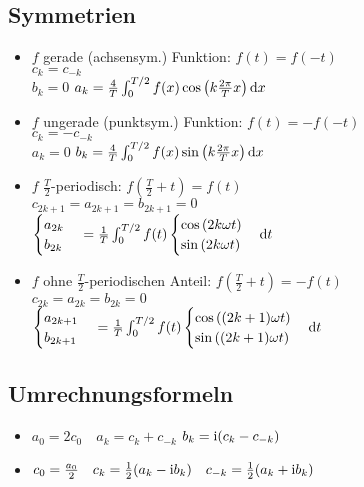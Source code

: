 \documentclass[german,color,6pt]{latex4ei/latex4ei_fs}
\begin{document}
\begin{sectionbox}
	\subsection{Symmetrien}
	\begin{itemize}
		\item $f$ gerade (achsensym.) Funktion: $f(t) = f(-t)$\\
		$c_k = c_{-k}$\\
		$b_k = 0$ \qquad $a_k = \frac{4}{T} \int_{0}^{T/2} f(x) \cos \left(k \frac{2\pi}{T} x \right) \diff x$
		\item $f$ ungerade (punktsym.) Funktion: $f(t) = -f(-t)$\\
		$c_k = -c_{-k}$\\
		$a_k = 0$ \qquad $ b_k = \frac{4}{T} \int_{0}^{T/2} f(x) \sin \left(k \frac{2\pi}{T} x \right) \diff x$
		\item $f$ $\frac{T}{2}$-periodisch: $f(\frac{T}{2} + t) = f(t)$\\
		$c_{2k+1} = a_{2k+1} = b_{2k+1} = 0$\\
		$\begin{cases} a_{2k}\\ b_{2k} \end{cases} = \frac{1}{T}\int_0^{T/2}f(t)\begin{cases} \cos{(2k \omega t)}\\ \sin{(2k \omega t)} \end{cases} \diff t$
		\item $f$ ohne $\frac{T}{2}$-periodischen Anteil: $f(\frac{T}{2} + t) = -f(t)$\\
		$c_{2k} = a_{2k} = b_{2k} = 0$\\
		$\begin{cases} a_{2k+1}\\ b_{2k+1} \end{cases} = \frac{1}{T}\int_0^{T/2}f(t)\begin{cases} \cos{((2k+1) \omega t)}\\ \sin{((2k+1) \omega t)} \end{cases} \diff t$
	\end{itemize}
\end{sectionbox}

\begin{sectionbox}
	\subsection{Umrechnungsformeln}
	\begin{itemize}
		\item $a_0 = 2 c_0 \quad a_k = c_k + c_{-k}$  \quad $b_k = \mathrm{i} (c_k - c_{-k})$
		\item $c_0 = \frac{a_0}{2} \quad c_k = \frac12(a_k - \mathrm{i} b_k) \quad c_{-k} = \frac12(a_k + \mathrm{i} b_k)$
	\end{itemize}
\end{sectionbox}
\end{document}
